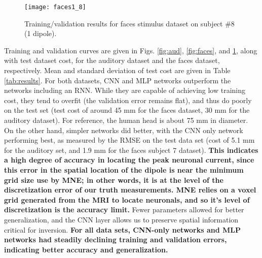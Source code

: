 \documentclass[journal]{IEEEtran}
\begin{document}
\begin{figure}[h!]
\centering
\texttt{[image: faces1\_8]}
\caption{Training/validation results for faces stimulus dataset on subject \#8 (1 dipole).}
\label{fig:faces_8}
\end{figure}

Training and validation curves are given in Figs. \ref{fig:aud}, \ref{fig:faces}, and \ref{fig:faces_8}, along with test dataset cost, for the auditory dataset and the faces dataset, respectively. Mean and standard deviation of test cost are given in Table \ref{tab:results}. For both datasets, CNN and MLP networks outperform the networks including an RNN. While they are capable of achieving low training cost, they tend to overfit (the validation error remains flat), and thus do poorly on the test set (test cost of around 45 mm for the faces dataset, 30 mm for the auditory dataset). For reference, the human head is about 75 mm in diameter. On the other hand, simpler networks did better, with the CNN only network performing best, as measured by the RMSE on the test data set (cost of 5.1 mm for the auditory set, and 1.9 mm for the faces subject 7 dataset). \textbf{This indicates a high degree of accuracy in locating the peak neuronal current, since this error in the spatial location of the dipole is near the minimum grid size use by MNE; in other words, it is at the level of the discretization error of our truth measurements. MNE relies on a voxel grid generated from the MRI to locate neuronals, and so it's level of discretization is the accuracy limit.} Fewer parameters allowed for better generalization, and the CNN layer allows us to preserve spatial information critical for inversion. \textbf{For all data sets, CNN-only networks and MLP networks had steadily declining training and validation errors, indicating better accuracy and generalization.}
\end{document}

